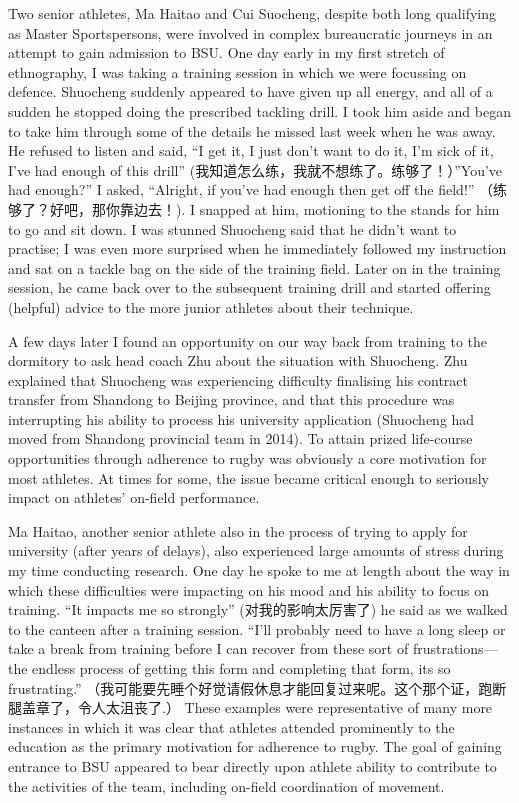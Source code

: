 \begin{CJK}{UTF8}{gbsn}
Two senior athletes, Ma Haitao and Cui Suocheng, despite both long qualifying as Master Sportspersons, were involved in complex bureaucratic journeys in an attempt to gain admission to BSU.  One day early in my first stretch of ethnography, I was taking a training session in which we were focussing on defence.  Shuocheng suddenly appeared to have given up all energy, and all of a sudden he stopped doing the prescribed tackling drill.  I took him aside and began to take him through some of the details he missed last week when he was away.  He refused to listen and said, ``I get it, I just don't want to do it, I'm sick of it, I've had enough of this drill'' (我知道怎么练，我就不想练了。练够了！）''You've had enough?'' I asked, ``Alright, if you've had enough then get off the field!'' （练够了？好吧，那你靠边去！).  I snapped at him, motioning to the stands for him to go and sit down. I was stunned Shuocheng said that he didn't want to practise; I was even more surprised when he immediately followed my instruction and sat on a tackle bag on the side of the training field.  Later on in the training session, he came back over to the subsequent training drill and started offering (helpful) advice to the more junior athletes about their technique.

A few days later I found an opportunity on our way back from training to the dormitory to ask head coach Zhu about the situation with Shuocheng.  Zhu explained that Shuocheng was experiencing difficulty finalising his contract transfer from Shandong to Beijing province, and that this procedure was interrupting his ability to process his university application (Shuocheng had moved from Shandong provincial team in 2014). To attain prized life-course opportunities through adherence to rugby was obviously a core motivation for most athletes. At times for some, the issue became critical enough to seriously impact on athletes' on-field performance.

Ma Haitao, another senior athlete also in the process of trying to apply for university (after years of delays), also experienced large amounts of stress during my time conducting research.  One day he spoke to me at length about the way in which these difficulties were impacting on his mood and his ability to focus on training. ``It impacts me so strongly'' (对我的影响太厉害了) he said as we walked to the canteen after a training session. ``I'll probably need to have a long sleep or take a break from training before I can recover from these sort of frustrations---the endless process of getting this form and completing that form, its so frustrating.'' （我可能要先睡个好觉请假休息才能回复过来呢。这个那个证，跑断腿盖章了，令人太沮丧了.）  These examples were representative of many more instances in which it was clear that athletes attended prominently to the education as the primary motivation for adherence to rugby.  The goal of gaining entrance to BSU appeared to bear directly upon athlete ability to contribute to the activities of the team, including on-field coordination of movement.


\end{CJK}
